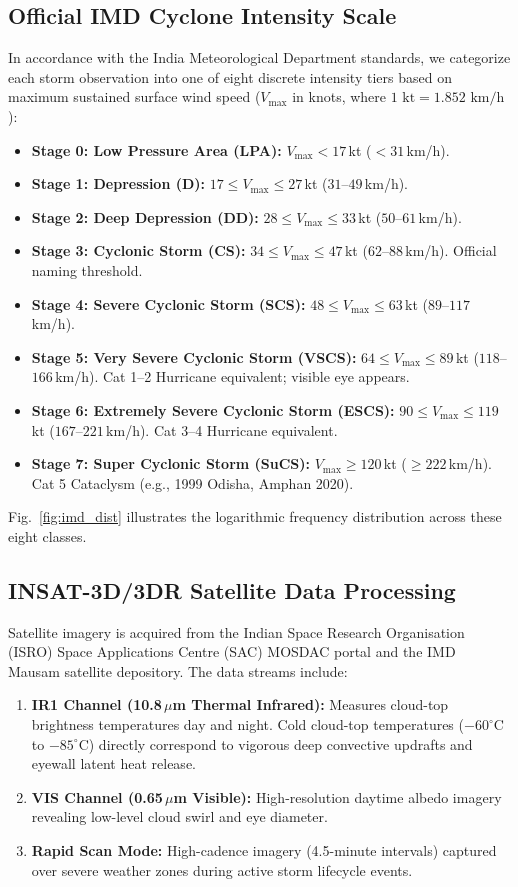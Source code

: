\documentclass[conference]{IEEEtran}
\begin{document}
\subsection{Official IMD Cyclone Intensity Scale}
In accordance with the India Meteorological Department standards, we categorize each storm observation into one of eight discrete intensity tiers based on maximum sustained surface wind speed ($V_{\text{max}}$ in knots, where $1\text{ kt} = 1.852\text{ km/h}$):
\begin{itemize}
    \item \textbf{Stage 0: Low Pressure Area (LPA):} $V_{\text{max}} < 17$\,kt ($< 31$\,km/h).
    \item \textbf{Stage 1: Depression (D):} $17 \le V_{\text{max}} \le 27$\,kt ($31$--$49$\,km/h).
    \item \textbf{Stage 2: Deep Depression (DD):} $28 \le V_{\text{max}} \le 33$\,kt ($50$--$61$\,km/h).
    \item \textbf{Stage 3: Cyclonic Storm (CS):} $34 \le V_{\text{max}} \le 47$\,kt ($62$--$88$\,km/h). Official naming threshold.
    \item \textbf{Stage 4: Severe Cyclonic Storm (SCS):} $48 \le V_{\text{max}} \le 63$\,kt ($89$--$117$\,km/h).
    \item \textbf{Stage 5: Very Severe Cyclonic Storm (VSCS):} $64 \le V_{\text{max}} \le 89$\,kt ($118$--$166$\,km/h). Cat 1--2 Hurricane equivalent; visible eye appears.
    \item \textbf{Stage 6: Extremely Severe Cyclonic Storm (ESCS):} $90 \le V_{\text{max}} \le 119$\,kt ($167$--$221$\,km/h). Cat 3--4 Hurricane equivalent.
    \item \textbf{Stage 7: Super Cyclonic Storm (SuCS):} $V_{\text{max}} \ge 120$\,kt ($\ge 222$\,km/h). Cat 5 Cataclysm (e.g., 1999 Odisha, Amphan 2020).
\end{itemize}
Fig.~\ref{fig:imd_dist} illustrates the logarithmic frequency distribution across these eight classes.

\subsection{INSAT-3D/3DR Satellite Data Processing}
Satellite imagery is acquired from the Indian Space Research Organisation (ISRO) Space Applications Centre (SAC) MOSDAC portal and the IMD Mausam satellite depository. The data streams include:
\begin{enumerate}
    \item \textbf{IR1 Channel (10.8\,$\mu$m Thermal Infrared):} Measures cloud-top brightness temperatures day and night. Cold cloud-top temperatures ($-60^\circ\text{C}$ to $-85^\circ\text{C}$) directly correspond to vigorous deep convective updrafts and eyewall latent heat release.
    \item \textbf{VIS Channel (0.65\,$\mu$m Visible):} High-resolution daytime albedo imagery revealing low-level cloud swirl and eye diameter.
    \item \textbf{Rapid Scan Mode:} High-cadence imagery (4.5-minute intervals) captured over severe weather zones during active storm lifecycle events.
\end{enumerate}
\end{document}
